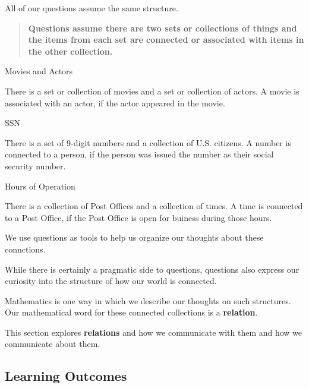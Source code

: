 \documentclass{ximera}
\begin{document}
All of our questions assume the same structure.  

\begin{center}
\begin{quote} 
\textbf{\textcolor{green!50!black}{Questions assume there are two sets or collections of things and \\ the items from each set are connected or associated with items in the other collection.}} 
\end{quote}
\end{center}


\begin{example} Movies and Actors 

There is a set or collection of movies and a set or collection of actors.  A movie is associated with an actor, if the actor appeared in the movie.
\end{example}

\begin{example} SSN 

There is a set of 9-digit numbers and a collection of U.S. citizens.  A number is connected to a person, if the person was issued the number as their social security number.
\end{example}

\begin{example} Hours of Operation 

There is a collection of Post Offices and a collection of times.  A time is connected to a Post Office, if the Post Office is open for buiness during those hours.
\end{example}

We use questions as tools to help us organize our thoughts about these connctions. 

While there is certainly a pragmatic side to questions, questions also express our curiosity into the structure of how our world is connected. 

Mathematics is one way in which we describe our thoughts on such structures. Our mathematical word for these connected collections is a \textbf{\textcolor{blue!75!black}{relation}}. 


This section explores \textbf{\textcolor{blue!75!black}{relations}} and how we communicate with them and how we communicate about them. 










\subsection*{Learning Outcomes}
\end{document}
